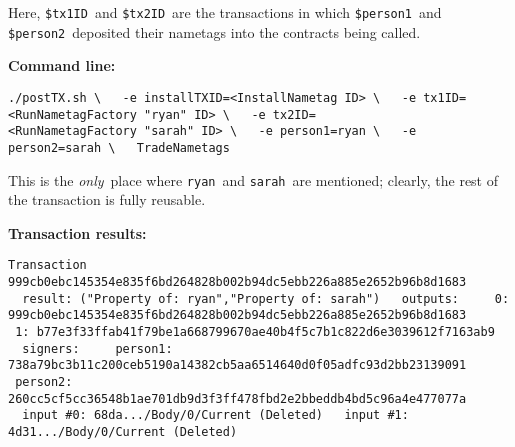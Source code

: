 \documentclass[11pt]{article}
\newcommand{\codeblock}[1]{\begin{mdframed}[
    backgroundcolor=header-color,
    linecolor=header-color,
    innertopmargin=10pt,
    ]{\texttt{#1}}\end{mdframed}}
\begin{document}
Here, \texttt{\$tx1ID} and \texttt{\$tx2ID} are the transactions in which \texttt{\$person1} and \texttt{\$person2} deposited their nametags into the contracts being called.


\vspace{11pt}
\textbf{Command line:}

\codeblock{.\slash{}postTX.sh \textbackslash{}\newline
  -e installTXID=\textless{}InstallNametag ID\textgreater{} \textbackslash{}\newline
  -e tx1ID=\textless{}RunNametagFactory "ryan" ID\textgreater{} \textbackslash{}\newline
  -e tx2ID=\textless{}RunNametagFactory "sarah" ID\textgreater{} \textbackslash{}\newline
  -e person1=ryan \textbackslash{}\newline
  -e person2=sarah \textbackslash{}\newline
  TradeNametags}

This is the \textit{only} place where \texttt{ryan} and \texttt{sarah} are mentioned; clearly, the rest of the transaction is fully reusable.


\vspace{11pt}

\textbf{Transaction results:}

\codeblock{Transaction 999cb0ebc145354e835f6bd264828b002b94dc5ebb226a885e2652b96b8d1683\newline
  result: ("Property of: ryan","Property of: sarah")\newline
  outputs:\newline
    0: 999cb0ebc145354e835f6bd264828b002b94dc5ebb226a885e2652b96b8d1683\newline
    1: b77e3f33ffab41f79be1a668799670ae40b4f5c7b1c822d6e3039612f7163ab9\newline
  signers:\newline
    person1: 738a79bc3b11c200ceb5190a14382cb5aa6514640d0f05adfc93d2bb23139091\newline
    person2: 260cc5cf5cc36548b1ae701db9d3f3ff478fbd2e2bbeddb4bd5c96a4e477077a\newline
  input \#0: 68da...\slash{}Body\slash{}0\slash{}Current (Deleted)\newline
  input \#1: 4d31...\slash{}Body\slash{}0\slash{}Current (Deleted)}
\end{document}
